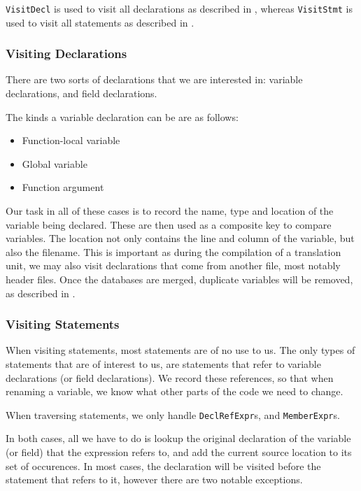 \lstinline|VisitDecl| is used to visit all declarations as described in
, whereas \lstinline|VisitStmt| is used to visit all
statements as described in .

\subsubsection{Visiting Declarations}
\label{sec:visitdecl}
There are two sorts of declarations that we are interested in: variable
declarations, and field declarations.

The kinds a variable declaration can be are as follows:
\begin{itemize}
	\item Function-local variable
	\item Global variable
	\item Function argument
\end{itemize}

Our task in all of these cases is to record the name, type and location of the
variable being declared. These are then used as a composite key to compare
variables. The location not only contains the line and column of the variable,
but also the filename. This is important as during the compilation of a
translation unit, we may also visit declarations that come from another file,
most notably header files. Once the databases are merged, duplicate variables
will be removed, as described in .

\subsubsection{Visiting Statements}
\label{sec:visitstmt}
When visiting statements, most statements are of no use to us. The only types
of statements that are of interest to us, are statements that refer to variable
declarations (or field declarations). We record these references, so that when
renaming a variable, we know what other parts of the code we need to change.

When traversing statements, we only handle \lstinline|DeclRefExpr|s, and
\lstinline|MemberExpr|s.

In both cases, all we have to do is lookup the original declaration of the
variable (or field) that the expression refers to, and add the current source
location to its set of occurences. In most cases, the declaration will be
visited before the statement that refers to it, however there are two notable
exceptions.

